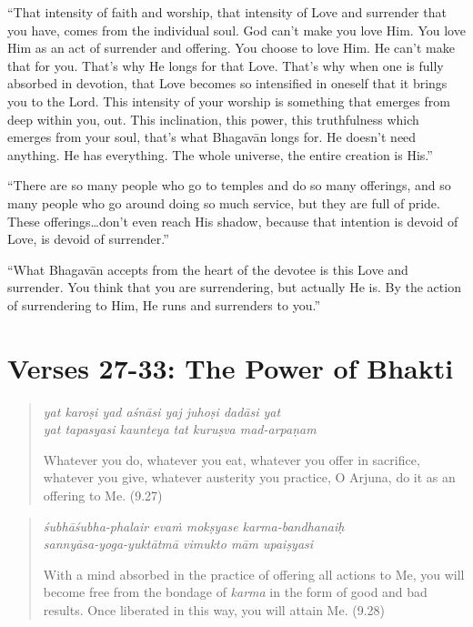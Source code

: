 \documentclass[12pt, twoside, openright]{memoir}
\begin{document}
\enquote{That intensity of faith and worship, that intensity of Love and surrender that you have, comes from the individual soul. God can’t make you love Him. You love Him as an act of surrender and offering. You choose to love Him. He can’t make that for you. That’s why He longs for that Love. That’s why when one is fully absorbed in devotion, that Love becomes so intensified in oneself that it brings you to the Lord. This intensity of your worship is something that emerges from deep within you, out. This inclination, this power, this truthfulness which emerges from your soul, that’s what Bhagavān longs for. He doesn’t need anything. He has everything. The whole universe, the entire creation is His.}

\enquote{There are so many people who go to temples and do so many offerings, and so many people who go around doing so much service, but they are full of pride. These offerings\ldots don’t even reach His shadow, because that intention is devoid of Love, is devoid of surrender.}

\enquote{What Bhagavān accepts from the heart of the devotee is this Love and surrender. You think that you are surrendering, but actually He is. By the action of surrendering to Him, He runs and surrenders to you.}

\section{Verses 27-33: The Power of Bhakti}\label{sec-verses-27-33-the-power-of-bhakti}


\par
\begin{verse}
\textit{yat karoṣi yad aśnāsi yaj juhoṣi dadāsi yat} \\
\textit{yat tapasyasi kaunteya tat kuruṣva mad-arpaṇam}

\noindent Whatever you do, whatever you eat, whatever you offer in sacrifice, whatever you give, whatever austerity you practice, O Arjuna, do it as an offering to Me. (9.27)
\end{verse}
\par



\par
\begin{verse}
\textit{śubhāśubha-phalair evaṁ mokṣyase karma-bandhanaiḥ} \\
\textit{sannyāsa-yoga-yuktātmā vimukto mām upaiṣyasi}

\noindent With a mind absorbed in the practice of offering all actions to Me, you will become free from the bondage of \textit{karma} in the form of good and bad results. Once liberated in this way, you will attain Me. (9.28)
\end{verse}
\par
\end{document}
